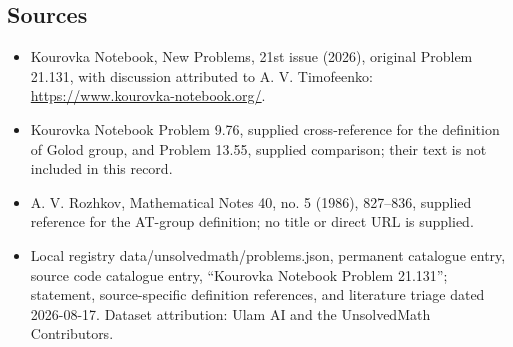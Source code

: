 \documentclass[11pt]{article}
\begin{document}
\subsection{Sources}
\begin{itemize}
\item Kourovka Notebook, New Problems, 21st issue (2026), original Problem 21.131, with discussion attributed to A. V. Timofeenko: \url{https://www.kourovka-notebook.org/}.
\item Kourovka Notebook Problem 9.76, supplied cross-reference for the definition of Golod group, and Problem 13.55, supplied comparison; their text is not included in this record.
\item A. V. Rozhkov, Mathematical Notes 40, no. 5 (1986), 827--836, supplied reference for the AT-group definition; no title or direct URL is supplied.
\item Local registry data/unsolvedmath/problems.json, permanent catalogue entry, source code catalogue entry, ``Kourovka Notebook Problem 21.131''; statement, source-specific definition references, and literature triage dated 2026-08-17. Dataset attribution: Ulam AI and the UnsolvedMath Contributors.
\end{itemize}
\end{document}
